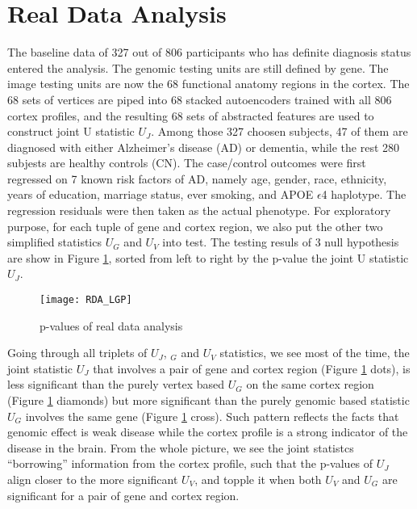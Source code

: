 \section{Real Data Analysis}
The baseline data of 327 out of 806 participants who has definite diagnosis status entered the analysis. The genomic testing units are still defined by gene. The image testing units are now the 68 functional anatomy regions in the cortex. The 68 sets of vertices are piped into 68 stacked autoencoders trained with all 806 cortex profiles, and the resulting 68 sets of abstracted features are used to construct joint U statistic $U_J$. Among those 327 choosen subjects, 47 of them are diagnosed with either Alzheimer's disease (AD) or dementia, while the rest 280 subjests are healthy controls (CN). The case/control outcomes were first regressed on 7 known risk factors of AD, namely age, gender, race, ethnicity, years of education, marriage status, ever smoking, and APOE $\epsilon$4 haplotype. The regression residuals were then taken as the actual phenotype. For exploratory purpose, for each tuple of gene and cortex region, we also put the other two simplified statistics $U_G$ and $U_V$ into test. The testing resuls of 3 null hypothesis are show in Figure \ref{fig:RDA_PVL}, sorted from left to right by the p-value the joint U statistic $U_J$.
\begin{figure}[!htbp]
\label{fig:RDA_PVL}
\centering
\texttt{[image: RDA\_LGP]}
\caption{p-values of real data analysis}
\end{figure}
Going through all triplets of $U_J$, $_G$ and $U_V$ statistics, we see most of the time, the joint statistic $U_J$ that involves a pair of gene and cortex region (Figure \ref{fig:RDA_PVL} dots), is less significant than the purely vertex based $U_G$ on the same cortex region (Figure \ref{fig:RDA_PVL} diamonds) but more significant than the purely genomic based statistic $U_G$ involves the same gene (Figure \ref{fig:RDA_PVL} cross). Such pattern reflects the facts that genomic effect is weak disease while the cortex profile is a strong indicator of the disease in the brain. From the whole picture, we see the joint statistcs ``borrowing'' information from the cortex profile, such that the p-values of $U_J$ align closer to the more significant $U_V$, and topple it when both $U_V$ and $U_G$ are significant for a pair of gene and cortex region.
